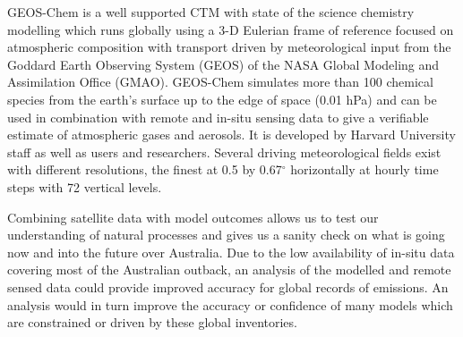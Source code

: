 GEOS-Chem is a well supported CTM with state of the science chemistry modelling which runs globally using a 3-D Eulerian frame of reference focused on atmospheric composition with transport driven by meteorological input from the Goddard Earth Observing System (GEOS) of the NASA Global Modeling and Assimilation Office (GMAO).
GEOS-Chem simulates more than 100 chemical species from the earth's surface up to the edge of space (0.01 hPa) and can be used in combination with remote and in-situ sensing data to give a verifiable estimate of atmospheric gases and aerosols.
It is developed by Harvard University staff as well as users and researchers. 
Several driving meteorological fields exist with different resolutions, the finest at 0.5 by 0.67$^\circ$ horizontally at hourly time steps with 72 vertical levels.


Combining satellite data with model outcomes allows us to test our understanding of natural processes and gives us a sanity check on what is going now and into the future over Australia.
Due to the low availability of in-situ data covering most of the Australian outback, an analysis of the modelled and remote sensed data could provide improved accuracy for global records of emissions.
An analysis would in turn improve the accuracy or confidence of many models which are constrained or driven by these global inventories.
